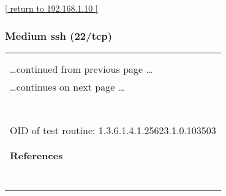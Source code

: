 \documentclass{article}
\begin{document}
\begin{footnotesize}\hyperref[host:192.168.1.10]{[ return to 192.168.1.10 ]}\end{footnotesize}
\subsubsection{Medium ssh (22/tcp)}
\label{port:192.168.1.10 ssh (22/tcp) Medium}

\begin{longtable}{|p{}|}
\hline
\rowcolor{openvas_warning}{\color{white}{Medium (CVSS: 3.5) }}\\
\rowcolor{openvas_warning}{\color{white}{NVT: openssh-server Forced Command Handling Information Disclosure Vulnerability}}\\
\hline
\endfirsthead
\hfill\ldots continued from previous page \ldots \\
\hline
\endhead
\hline
\ldots continues on next page \ldots \\
\endfoot
\hline
\endlastfoot
\\
\rowcolor{white}{\verb=According to its banner, the version of OpenSSH installed on the remote=}\\
\rowcolor{white}{\verb=host is older than 5.7:=}\\
\rowcolor{white}{\verb= ssh-2.0-openssh_5.3p1 debian-3ubuntu7=}\\
\rowcolor{white}{\verb==}\\
\rowcolor{white}{\verb==}\\
\\
OID of test routine: 1.3.6.1.4.1.25623.1.0.103503\\
\\

      \hline
      \\
\textbf{References}\\
\rowcolor{white}{\verb=CVE: CVE-2012-0814=}\\
\rowcolor{white}{\verb=BID:51702=}\\
\rowcolor{white}{\verb=Other:=}\\
\rowcolor{white}{\verb=  URL:http://www.securityfocus.com/bid/51702=}\\
\rowcolor{white}{\verb=   URL:http://bugs.debian.org/cgi-bin/bugreport.cgi?bug=\verb-=-\verb=657445=}\\
\rowcolor{white}{\verb=   URL:http://packages.debian.org/squeeze/openssh-server=}\\
\rowcolor{white}{\verb=   URL:https://downloads.avaya.com/css/P8/documents/100161262=}\\
\end{longtable}
\end{document}
